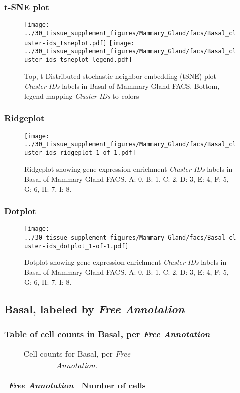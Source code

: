 \clearpage
\subsubsection{t-SNE plot}
\begin{figure}[h]
\centering
\texttt{[image: ../30\_tissue\_supplement\_figures/Mammary\_Gland/facs/Basal\_cluster-ids\_tsneplot.pdf]}
\texttt{[image: ../30\_tissue\_supplement\_figures/Mammary\_Gland/facs/Basal\_cluster-ids\_tsneplot\_legend.pdf]}
\caption{Top, t-Distributed stochastic neighbor embedding (tSNE) plot  \emph{Cluster IDs} labels in Basal of Mammary Gland FACS. Bottom, legend mapping \emph{Cluster IDs} to colors}
\end{figure}


\clearpage

\subsubsection{Ridgeplot}
\begin{figure}[h]
\centering
\texttt{[image: ../30\_tissue\_supplement\_figures/Mammary\_Gland/facs/Basal\_cluster-ids\_ridgeplot\_1-of-1.pdf]}

\caption{ Ridgeplot  showing gene expression enrichment \emph{Cluster IDs} labels in Basal of Mammary Gland FACS. A: 0, B: 1, C: 2, D: 3, E: 4, F: 5, G: 6, H: 7, I: 8.}
\end{figure}


\clearpage

\subsubsection{Dotplot}
\begin{figure}[h]
\centering
\texttt{[image: ../30\_tissue\_supplement\_figures/Mammary\_Gland/facs/Basal\_cluster-ids\_dotplot\_1-of-1.pdf]}

\caption{ Dotplot  showing gene expression enrichment \emph{Cluster IDs} labels in Basal of Mammary Gland FACS. A: 0, B: 1, C: 2, D: 3, E: 4, F: 5, G: 6, H: 7, I: 8.}
\end{figure}


\clearpage

\subsection{Basal, labeled by \emph{Free Annotation}}
\subsubsection{Table of cell counts in Basal, per \emph{Free Annotation}}\begin{table}[h]
\centering
\label{my-label}
\begin{tabular}{@{}ll@{}}
\toprule

\emph{Free Annotation}& Number of cells \\ \midrule\bottomrule
\end{tabular}
\caption{Cell counts for Basal, per \emph{Free Annotation}.}
\end{table}

